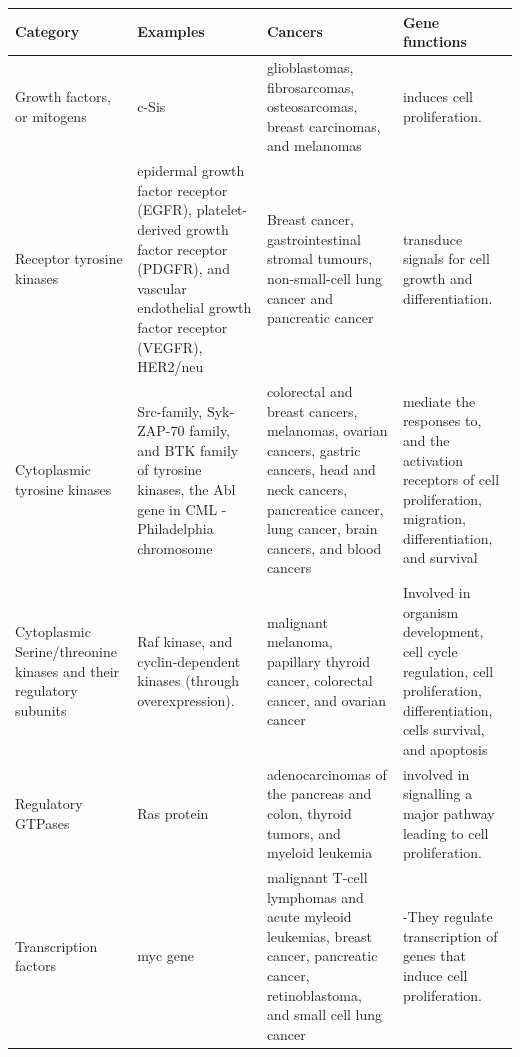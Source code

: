 \documentclass{article}
\begin{document}
\begin{tabular}{llll}
\toprule
Category & Examples & Cancers & Gene functions \\
\midrule
Growth factors, or mitogens & c-Sis & glioblastomas, fibrosarcomas, osteosarcomas, breast carcinomas, and melanomas & induces cell proliferation. \\
Receptor tyrosine kinases & epidermal growth factor receptor (EGFR), platelet-derived growth factor receptor (PDGFR), and vascular endothelial growth factor receptor (VEGFR), HER2/neu & Breast cancer, gastrointestinal stromal tumours, non-small-cell lung cancer and pancreatic cancer & transduce signals for cell growth and differentiation. \\
Cytoplasmic tyrosine kinases & Src-family, Syk-ZAP-70 family, and BTK family of tyrosine kinases, the Abl gene in CML - Philadelphia chromosome & colorectal and breast cancers, melanomas, ovarian cancers, gastric cancers, head and neck cancers, pancreatice cancer, lung cancer, brain cancers, and blood cancers & mediate the responses to, and the activation receptors of cell proliferation, migration, differentiation, and survival \\
Cytoplasmic Serine/threonine kinases and their regulatory subunits & Raf kinase, and cyclin-dependent kinases (through overexpression). & malignant melanoma, papillary thyroid cancer, colorectal cancer, and ovarian cancer & Involved in organism development, cell cycle regulation, cell proliferation, differentiation, cells survival, and apoptosis \\
Regulatory GTPases & Ras protein & adenocarcinomas of the pancreas and colon, thyroid tumors, and myeloid leukemia & involved in signalling a major pathway leading to cell proliferation. \\
Transcription factors & myc gene & malignant T-cell lymphomas and acute myleoid leukemias, breast cancer, pancreatic cancer, retinoblastoma, and small cell lung cancer & -They regulate transcription of genes that induce cell proliferation. \\
\bottomrule
\end{tabular}
\end{document}
